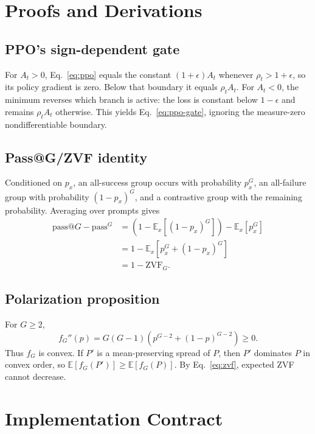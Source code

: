 \documentclass{article}
\newcommand{\E}{\mathbb{E}}
\begin{document}



\appendix

\section{Proofs and Derivations}
\label{app:proofs}

\subsection{PPO's sign-dependent gate}

For $A_t>0$, Eq.~\eqref{eq:ppo} equals the constant
$(1+\epsilon)A_t$ whenever $\rho_t>1+\epsilon$, so its policy gradient is zero.
Below that boundary it equals $\rho_tA_t$.  For $A_t<0$, the minimum reverses
which branch is active: the loss is constant below $1-\epsilon$ and remains
$\rho_tA_t$ otherwise.  This yields Eq.~\eqref{eq:ppo-gate}, ignoring the
measure-zero nondifferentiable boundary.

\subsection{Pass@G/ZVF identity}

Conditioned on $p_x$, an all-success group occurs with probability $p_x^G$,
an all-failure group with probability $(1-p_x)^G$, and a contrastive group
with the remaining probability.  Averaging over prompts gives
\begin{align*}
  \mathrm{pass@}G-\mathrm{pass}^{G}
  &=\left(1-\E_x[(1-p_x)^G]\right)-\E_x[p_x^G]\\
  &=1-\E_x[p_x^G+(1-p_x)^G]\\
  &=1-\mathrm{ZVF}_G.
\end{align*}

\subsection{Polarization proposition}

For $G\geq2$,
\begin{equation*}
  f_G''(p)=G(G-1)\left(p^{G-2}+(1-p)^{G-2}\right)\geq0.
\end{equation*}
Thus $f_G$ is convex.  If $P'$ is a mean-preserving spread of $P$, then $P'$ 
dominates $P$ in convex order, so $\E[f_G(P')]\geq\E[f_G(P)]$.  By
Eq.~\eqref{eq:zvf}, expected ZVF cannot decrease.

\section{Implementation Contract}
\label{app:implementation}
\end{document}
